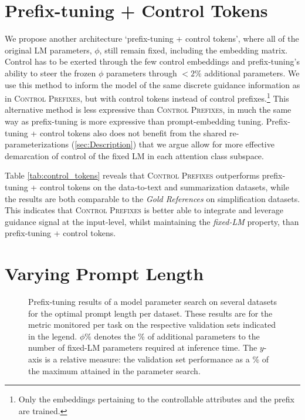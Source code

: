\documentclass[11pt]{article}
\newcommand{\control}{\textsc{Control Prefixes}\xspace}
\newcommand{\bartl}{BART$_{\text {LARGE }}$}
\begin{document}
\section{Prefix-tuning + Control Tokens}
\label{app:control_tokens}

We propose another architecture \enquote*{prefix-tuning + control tokens}, where all of the original LM parameters, $\phi$, still remain fixed, including the embedding matrix. Control has to be exerted through the few control embeddings and prefix-tuning's ability to steer the frozen $\phi$ parameters through $<2\%$ additional parameters.
We use this method to inform the model of the same discrete guidance information as in \control, but with control tokens instead of control prefixes.\footnote{Only the embeddings pertaining to the controllable attributes and the prefix are trained.} This alternative method is less expressive than \control, in much the same way as prefix-tuning is more expressive than prompt-embedding tuning. Prefix-tuning + control tokens also does not benefit from the shared re-parameterizations (\cref{sec:Description}) that we argue allow for more effective demarcation of control of the fixed LM in each attention class subspace. 

Table \ref{tab:control_tokens} reveals that \control outperforms prefix-tuning + control tokens on the data-to-text and summarization datasets, while the results are both comparable to the \emph{Gold References} on simplification datasets. This indicates that \control is better able to integrate and leverage guidance signal at the input-level, whilst maintaining the \emph{fixed-LM} property, than prefix-tuning + control tokens. 


\section{Varying Prompt Length}
\label{app:prompt_length}


\begin{figure}[h]
    \centering
    \subfloat[\centering \bartl ]{\texttt{[image: Figures/BART\_prompt.pdf]} }\qquad
    \qquad

 
    \caption{Prefix-tuning results of a model parameter search on several datasets for the optimal prompt length per dataset.  These results are for the metric monitored per task on the respective validation sets indicated in the legend. $\phi\%$ denotes the \% of additional parameters to the number of fixed-LM parameters required at inference time. The $y$-axis is a relative measure: the validation set performance as a \% of the maximum attained in the parameter search.} 
    \label{fig:prefix_len_proxy}\end{figure}
\end{document}
